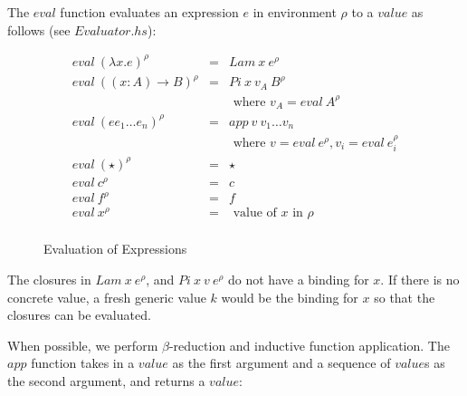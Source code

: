 \documentclass[acmsmall]{acmart}
\begin{document}
The $eval$ function evaluates an expression $e$ in environment $\rho$ to a
$value$ as follows (see $Evaluator.hs$):

\begin{figure}[H]
  \begin{equation*}
    \begin{aligned}
      eval \: (\lambda x . e)^{\rho}   & = & Lam \: x \: e^{\rho}                                            \\
      eval \: ((x:A) \to B)^{\rho}     & = & Pi \: x \: v_A \: B^{\rho}                                      \\
                                       &   & \textrm{ where } v_A = eval \: A^{\rho}                         \\
      eval \: (e e_1 \dots e_n)^{\rho} & = & app \: v \: v_1 \dots v_n                                       \\
                                       &   & \textrm{ where } v = eval \: e^{\rho}, v_i = eval \: e_i^{\rho} \\
      eval \: (\star)^{\rho}           & = & \star                                                           \\
      eval \: c^{\rho}                 & = & c                                                               \\
      eval \: f^{\rho}                 & = & f                                                               \\
      eval \: x^{\rho}                 & = & \textrm{ value of } x \textrm{ in } \rho                        \\
    \end{aligned}
  \end{equation*}
  \caption{Evaluation of Expressions}
\end{figure}

The closures in $Lam \: x \: e^{\rho}$, and $Pi \: x \: v \: e^{\rho}$ do not have a
binding for $x$. If there is no concrete value, a fresh generic value $k$ would be
the binding for $x$ so that the closures can be evaluated.

When possible, we perform $\beta$-reduction and inductive function application. The $app$ function takes in a $value$ as the first argument and a sequence of
$value$s as the second argument, and returns a $value$: 
\end{document}
